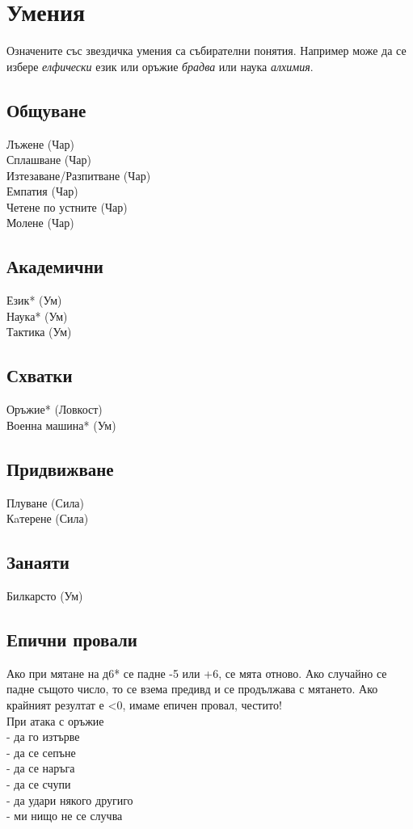 
\section{Умения}
Означените със звездичка умения са събирателни понятия.
Например може да се избере \textit{елфически} език или оръжие \textit{брадва} или наука \textit{алхимия}.
\subsection{Общуване}
Лъжене (Чар)                      \\
Сплашване (Чар)                   \\
Изтезаване/Разпитване (Чар)       \\
Емпатия (Чар)                     \\
Четене по устните (Чар)           \\
Молене (Чар)                      \\

\subsection{Академични}
Език* (Ум)                        \\
Наука* (Ум)                       \\
Тактика (Ум)                      \\

\subsection{Схватки}
Оръжие* (Ловкост)                 \\
Военна машина* (Ум)               \\

\subsection{Придвижване}
Плуване (Сила)                    \\
Кaтерене (Сила)                   \\

\subsection{Занаяти}
Билкарсто (Ум)                    \\

\subsection{Епични провали}
Ако при мятане на д6* се падне -5 или +6, се мята отново.
Ако случайно се падне същото число, то се взема предивд и се продължава с мятането.
Ако крайният резултат е <0, имаме епичен провал, честито!  \\

При атака с оръжие           \\
- да го изтърве              \\
- да се сепъне               \\
- да се наръга               \\
- да се счупи                \\
- да удари някого другиго    \\
- ми нищо не се случва       \\
